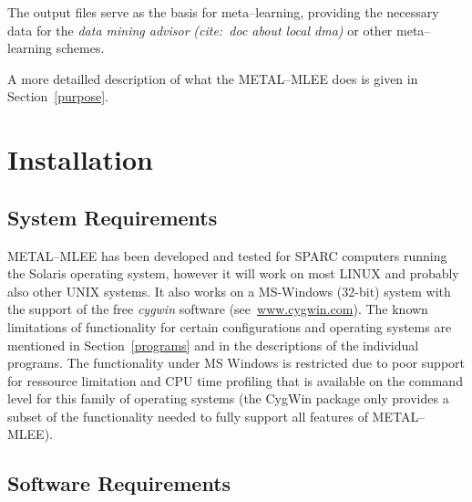 \documentclass[a4paper,10pt,twoside]{article}
\newcommand{\eenameshort}{\textsf{METAL--MLEE}}
\newcommand{\citex}[1]{\textsl{(cite:~{#1})}}
\begin{document}
The output files  serve as the basis for meta--learning,
providing the necessary data for the \emph{data mining advisor} 
\citex{doc about local dma} or other meta--learning schemes.

A more detailled description of what the \eenameshort{} does
is given in Section~\ref{purpose}.


\section{Installation}
\label{install}
\subsection{System Requirements}

\eenameshort{} has been developed and tested for SPARC computers
running the Solaris operating system, however it will work on
most LINUX and probably also other UNIX systems. It also works 
on a MS-Windows (32-bit) system with the support of the free 
\emph{cygwin} software (see~\url{www.cygwin.com}).
The known limitations of functionality for certain configurations
and operating systems
are mentioned in Section~\ref{programs} and in the descriptions of 
the individual programs. The functionality under MS Windows is
restricted due to poor support for 
ressource limitation and CPU time profiling that is available 
on the command level for this family of operating systems 
(the CygWin package only provides a subset of the functionality
needed to fully support all features of \eenameshort{}).

\subsection{Software Requirements}
\end{document}
